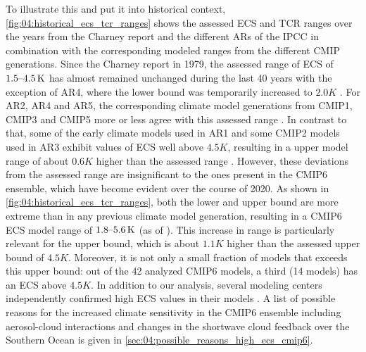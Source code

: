 To illustrate this and put it into historical context,
\cref{fig:04:historical_ecs_tcr_ranges} shows the assessed \ac{ECS} and
\ac{TCR} ranges over the years from the Charney report \autocite{Charney1979}
and the different \acp{AR} of the \ac{IPCC} in combination with the
corresponding modeled ranges from the different \ac{CMIP} generations. Since
the Charney report in 1979, the assessed range of \ac{ECS} of $\range{1.5}{4.5}
\unit{K}$ has almost remained unchanged during the last 40 years
\autocite{Charney1979, Mitchell1990, Kattenberg1996, Albritton2001,
  Stocker2013} with the exception of \acs{AR}4, where the lower bound was
temporarily increased to $2.0 \unit{K}$ \autocite{Solomon2007}. For \acs{AR}2,
\acs{AR}4 and \acs{AR}5, the corresponding climate model generations from
\acs{CMIP}1, \acs{CMIP}3 and \acs{CMIP}5 more or less agree with this assessed
range \autocite{Kattenberg1996, Randall2007, Flato2013}. In contrast to that,
some of the early climate models used in \acs{AR}1 and some \acs{CMIP}2 models
used in \acs{AR}3 exhibit values of \acs{ECS} well above $4.5 \unit{K}$,
resulting in a upper model range of about $0.6 \unit{K}$ higher than the
assessed range \autocite{Mitchell1990, Cubasch2001}. However, these deviations
from the assessed range are insignificant to the ones present in the
\acs{CMIP}6 ensemble, which have become evident over the course of 2020. As
shown in \cref{fig:04:historical_ecs_tcr_ranges}, both the lower and upper
bound are more extreme than in any previous climate model generation, resulting
in a \acs{CMIP}6  \ac{ECS} model range of $\range{1.8}{5.6} \unit{K}$ (as of
\TheMonth{}). This increase in range is particularly relevant for the upper
bound, which is about $1.1 \unit{K}$ higher than the assessed upper bound of
$4.5 \unit{K}$. Moreover, it is not only a small fraction of models that
exceeds this upper bound: out of the 42 analyzed \ac{CMIP}6 models, a third (14
models) has an \ac{ECS} above $4.5 \unit{K}$. In addition to our analysis,
several modeling centers independently confirmed high \ac{ECS} values in their
models \autocite{Andrews2019, Gettelman2019, Wyser2020}. A list of possible
reasons for the increased climate sensitivity in the \acs{CMIP}6 ensemble
including aerosol-cloud interactions and changes in the shortwave cloud
feedback over the Southern Ocean is given in
\cref{sec:04:possible_reasons_high_ecs_cmip6}.

